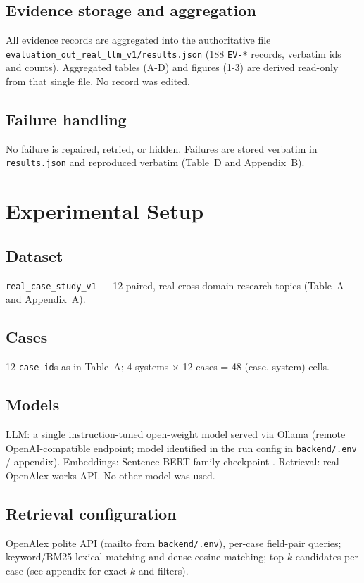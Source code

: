 \documentclass[11pt]{article}
\begin{document}
\subsection{Evidence storage and aggregation}
\label{sec:storage}
All evidence records are aggregated into the authoritative file
\texttt{evaluation\_out\_real\_llm\_v1/results.json} (188 \texttt{EV-*} records,
verbatim ids and counts). Aggregated tables (A-D) and figures (1-3) are derived
read-only from that single file. No record was edited.

\subsection{Failure handling}
\label{sec:failures}
No failure is repaired, retried, or hidden. Failures are stored verbatim in
\texttt{results.json} and reproduced verbatim (Table~D and Appendix~B).

\section{Experimental Setup}
\label{sec:setup}

\subsection{Dataset}
\texttt{real\_case\_study\_v1} --- 12 paired, real cross-domain research topics
(Table~A and Appendix~A).

\subsection{Cases}
12 \texttt{case\_id}s as in Table~A; 4 systems $\times$ 12 cases = 48
(case, system) cells.

\subsection{Models}
LLM: a single instruction-tuned open-weight model served via Ollama (remote
OpenAI-compatible endpoint; model identified in the run config in
\texttt{backend/.env} / appendix). Embeddings: Sentence-BERT family checkpoint
\citep{sbert}. Retrieval: real OpenAlex works API. No other model was used.

\subsection{Retrieval configuration}
OpenAlex polite API (mailto from \texttt{backend/.env}), per-case field-pair
queries; keyword/BM25 lexical matching and dense cosine matching; top-$k$
candidates per case (see appendix for exact $k$ and filters).
\end{document}
